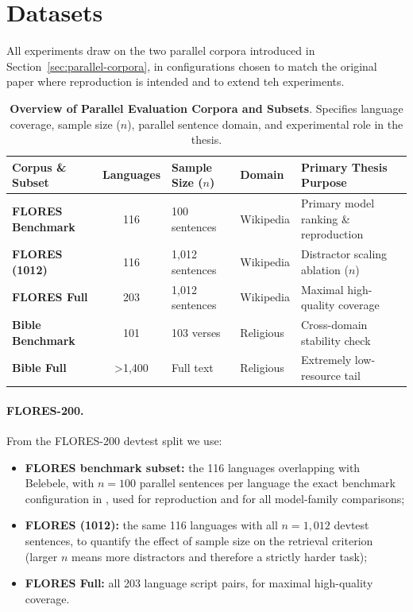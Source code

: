 \section{Datasets}
\label{sec:datasets}

All experiments draw on the two parallel corpora introduced in
Section~\ref{sec:parallel-corpora}, in configurations chosen to match the
original paper where reproduction is intended and to extend teh experiments.

\begin{table}[H]
\centering
\caption{\textbf{Overview of Parallel Evaluation Corpora and Subsets}. Specifies language coverage, sample size ($n$), parallel sentence domain, and experimental role in the thesis.}
\label{tab:evaluation-datasets-overview}
\small
\begin{tabular}{lcsll}
\toprule
\textbf{Corpus \& Subset} & \textbf{Languages} & \textbf{Sample Size ($n$)} & \textbf{Domain} & \textbf{Primary Thesis Purpose} \\
\midrule
\textbf{FLORES Benchmark} & 116 & 100 sentences & Wikipedia & Primary model ranking \& reproduction \\
\textbf{FLORES (1012)} & 116 & 1,012 sentences & Wikipedia & Distractor scaling ablation ($n$) \\
\textbf{FLORES Full} & 203 & 1,012 sentences & Wikipedia & Maximal high-quality coverage \\
\midrule
\textbf{Bible Benchmark} & 101 & 103 verses & Religious & Cross-domain stability check \\
\textbf{Bible Full} & >1,400 & Full text & Religious & Extremely low-resource tail \\
\bottomrule
\end{tabular}
\end{table}

\paragraph{FLORES-200.}
From the FLORES-200 devtest split \citep{nllbteam2022} we use:
\begin{itemize}
    \item \textbf{FLORES benchmark subset:} the 116 languages overlapping
    with Belebele, with $n = 100$ parallel sentences per language
    the exact benchmark configuration in \citet{kargaran2025mexa}, used
    for reproduction and for all model-family comparisons;
    \item \textbf{FLORES (1012):} the same 116 languages with all
    $n = 1{,}012$ devtest sentences, to quantify the effect of sample
    size on the retrieval criterion (larger $n$ means more distractors
    and therefore a strictly harder task);
    \item \textbf{FLORES Full:} all 203 language script pairs, for
    maximal high-quality coverage.
\end{itemize}

